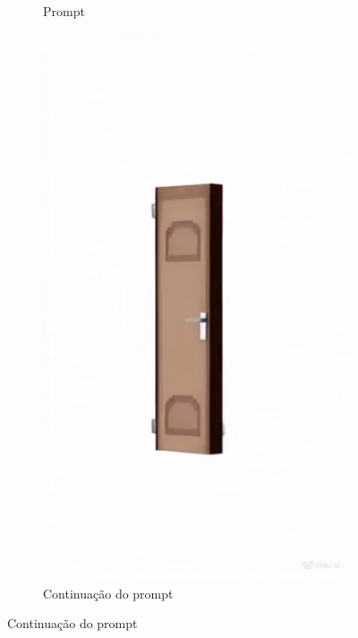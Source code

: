 \begin{figure}[htbp]
\begin{subfigure}{0.42\linewidth}
        \caption{\small Prompt}
        \label{fig:viduPorta1b}
    \end{subfigure}
    \begin{subfigure}{0.32\linewidth}
        \includegraphics[width=1\linewidth]{figs/vidu/framePorta1.jpg}
        \caption{\small Continuação do prompt}
        \label{fig:viduPorta1c}
    \end{subfigure}
\end{figure}

